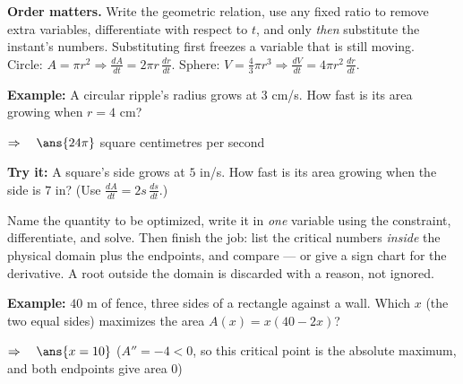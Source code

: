 \documentclass[12pt]{article}
\begin{document}

\begin{formulabox}
\textbf{Order matters.} Write the geometric relation, use any fixed ratio to
remove extra variables, differentiate with respect to $t$, and only \emph{then}
substitute the instant's numbers. Substituting first freezes a variable that is
still moving.\\[3pt]
Circle: $A = \pi r^2 \Rightarrow \frac{dA}{dt} = 2\pi r\,\frac{dr}{dt}$. \quad
Sphere: $V = \frac{4}{3}\pi r^3 \Rightarrow
\frac{dV}{dt} = 4\pi r^2\,\frac{dr}{dt}$.
\end{formulabox}

\begin{examplebox}
\textbf{Example:} \quad A circular ripple's radius grows at $3$ cm/s. How fast
is its area growing when $r = 4$ cm?

$\Rightarrow\quad \ans{24\pi}$ square centimetres per second
\end{examplebox}

\begin{tryitbox}
\textbf{Try it:} \quad A square's side grows at $5$ in/s. How fast is its area
growing when the side is $7$ in? (Use $\frac{dA}{dt} = 2s\,\frac{ds}{dt}$.)\\[2pt]
\end{tryitbox}


\begin{formulabox}
Name the quantity to be optimized, write it in \emph{one} variable using the
constraint, differentiate, and solve. Then finish the job: list the critical
numbers \emph{inside} the physical domain plus the endpoints, and compare --- or
give a sign chart for the derivative. A root outside the domain is discarded
with a reason, not ignored.
\end{formulabox}

\begin{examplebox}
\textbf{Example:} \quad $40$ m of fence, three sides of a rectangle against a
wall. Which $x$ (the two equal sides) maximizes the area $A(x) = x(40 - 2x)$?

$\Rightarrow\quad \ans{x = 10}$ \quad ($A'' = -4 < 0$, so this critical point
is the absolute maximum, and both endpoints give area $0$)
\end{examplebox}
\end{document}
